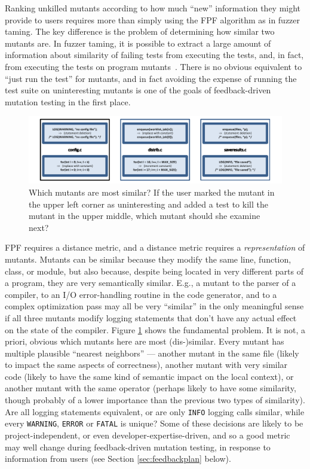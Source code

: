 Ranking unkilled mutants according to how much ``new'' information they might
provide to users requires more than simply using the FPF algorithm as
in fuzzer taming.  The key difference is the problem of determining
how similar two mutants are.  In fuzzer taming, it is possible to
extract a large amount of information about similarity of failing
tests from executing the tests, and, in fact, from executing the tests
on program mutants~\cite{PLDI13,distMut}.  There is no obvious
equivalent to
``just run the test'' for mutants, and in fact avoiding the expense of running
the test suite on uninteresting mutants is one of the goals of
feedback-driven mutation testing in the first place.

\begin{figure}[t]
\centering
\includegraphics[width=0.95\columnwidth]{distmetric}

\caption{Which mutants are most similar?  If the user marked the
  mutant in the upper left corner as uninteresting and added a test
  to kill the
  mutant in the upper middle, which mutant
  should she examine next?}
\label{fig:distances}
\end{figure}


FPF requires a distance metric, and a distance metric requires a
\emph{representation} of mutants.  Mutants can be similar because they
modify the same line, function, class, or module, but also because,
despite being located in very different parts of a program, they are
very semantically similar.  E.g., a mutant to the parser of a compiler, to
an I/O error-handling routine in the code generator, and to a complex
optimization pass may all be very ``similar'' in the only meaningful
sense if all three mutants modify logging statements that don't have
any actual effect on the state of the compiler.  Figure
\ref{fig:distances} shows the fundamental problem.  It is not,
a priori, obvious which mutants here are most (dis-)similar.  Every
mutant has multiple plausible ``nearest neighbors'' --- another mutant
in the same file (likely to impact the same aspects of correctness),
another mutant with very similar code (likely to have the same kind of
semantic impact on the local context), or another mutant with the same operator (perhaps
likely to have some similarity, though probably of a lower importance
than the previous two types of similarity).  Are all logging statements
equivalent, or are only {\tt INFO} logging calls similar, while every
{\tt WARNING}, {\tt ERROR} or {\tt FATAL} is unique?  Some of these
decisions are likely to be project-independent, or even
developer-expertise-driven, and so a good metric
may well change during feedback-driven mutation testing, in response
to information from users (see Section \ref{sec:feedbackplan} below).

